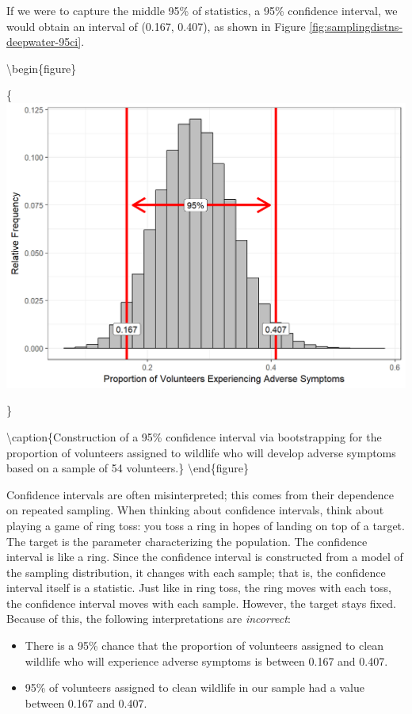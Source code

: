 \documentclass[]{book}
\providecommand{\tightlist}{%
  \setlength{\itemsep}{0pt}\setlength{\parskip}{0pt}}
\theoremstyle{definition}
\theoremstyle{definition}
\theoremstyle{definition}
\theoremstyle{remark}
\begin{document}
If we were to capture the middle 95\% of statistics, a 95\% confidence
interval, we would obtain an interval of (0.167, 0.407), as shown in
Figure \ref{fig:samplingdistns-deepwater-95ci}.

\textbackslash{}begin\{figure\}

\{\centering \includegraphics[width=0.8\linewidth]{./Images/samplingdistns-deepwater-95ci-1}

\}

\textbackslash{}caption\{Construction of a 95\% confidence interval via
bootstrapping for the proportion of volunteers assigned to wildlife who
will develop adverse symptoms based on a sample of 54
volunteers.\}\label{fig:samplingdistns-deepwater-95ci}
\textbackslash{}end\{figure\}

Confidence intervals are often misinterpreted; this comes from their
dependence on repeated sampling. When thinking about confidence
intervals, think about playing a game of ring toss: you toss a ring in
hopes of landing on top of a target. The target is the parameter
characterizing the population. The confidence interval is like a ring.
Since the confidence interval is constructed from a model of the
sampling distribution, it changes with each sample; that is, the
confidence interval itself is a statistic. Just like in ring toss, the
ring moves with each toss, the confidence interval moves with each
sample. However, the target stays fixed. Because of this, the following
interpretations are \emph{incorrect}:

\begin{itemize}
\tightlist
\item
  There is a 95\% chance that the proportion of volunteers assigned to
  clean wildlife who will experience adverse symptoms is between 0.167
  and 0.407.
\item
  95\% of volunteers assigned to clean wildlife in our sample had a
  value between 0.167 and 0.407.
\end{itemize}
\end{document}
